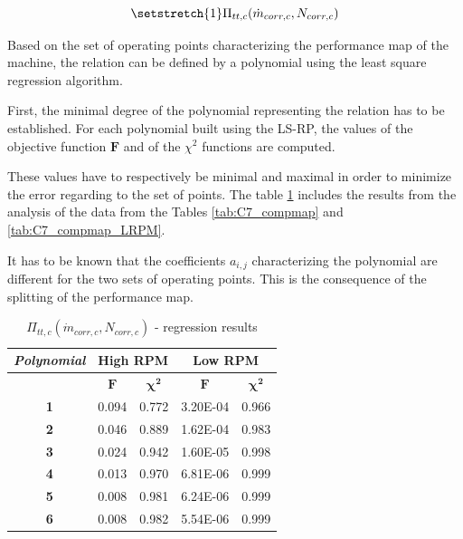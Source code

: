 \begin{equation}
    \setstretch{1}
    \Pi_{tt,c}(\dot{m}_{corr,c},N_{corr,c}) \label{eq:C7_Pratio}
\end{equation}

Based on the set of operating points characterizing the performance map of the machine, the relation can be defined by a polynomial using the least square regression algorithm.

First, the minimal degree of the polynomial representing the relation has to be established. For each polynomial built using the LS-RP, the values of the objective function $\textbf{F}$ and of the $\chi^2$ functions are computed. 

These values have to respectively be minimal and maximal in order to minimize the error regarding to the set of points. The table \ref{tab:C7_regcomp} includes the results from the analysis of the data from the Tables \ref{tab:C7_compmap} and \ref{tab:C7_compmap_LRPM}. 

It has to be known that the coefficients $a_{i,j}$ characterizing the polynomial are different for the two sets of operating points. This is the consequence of the splitting of the performance map. 


\begin{longtable}[c]{@{}ccc|cc@{}}
\caption{$\Pi_{tt,c}(\dot{m}_{corr,c},N_{corr,c})$ - regression results }
\label{tab:C7_regcomp}\\
\toprule
\textit{\textbf{Polynomial}} & \multicolumn{2}{c|}{High RPM}  & \multicolumn{2}{c}{Low RPM}    \\* \midrule
\endfirsthead
%
\endhead
%
\bottomrule
\endfoot
%
\endlastfoot
%
\multicolumn{1}{c}{\textbf{Degree}}              & \multicolumn{1}{c}{$\mathbf{F}$} & \multicolumn{1}{c|}{$\mathbf{\chi^2}$} & \multicolumn{1}{c}{$\mathbf{F}$} & \multicolumn{1}{c}{$\mathbf{\chi^2}$} \\
\multicolumn{1}{c}{\textbf{1}}                   & 0.094      & 0.772             & 3.20E-04   & 0.966             \\
\multicolumn{1}{c}{\textbf{2}}                   & 0.046      & 0.889             & 1.62E-04   & 0.983             \\
\multicolumn{1}{c}{\textbf{3}}                   & 0.024      & 0.942             & 1.60E-05   & 0.998             \\
\multicolumn{1}{c}{\textbf{4}}                   & 0.013      & 0.970             & 6.81E-06   & 0.999             \\
\multicolumn{1}{c}{\textbf{5}}                   & 0.008      & 0.981             & 6.24E-06   & 0.999             \\
\multicolumn{1}{c}{\textbf{6}}                   & 0.008      & 0.982             & 5.54E-06   & 0.999             \\* \bottomrule
\end{longtable}


